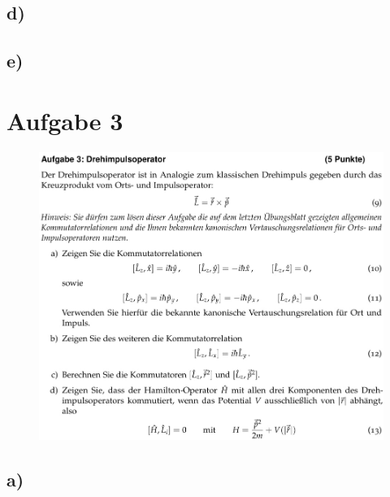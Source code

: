     \subsection{d)}

    \subsection{e)}


\section{Aufgabe 3}

    \begin{figure}[H]
        \centering
        \includegraphics[width=\textwidth]{images/Aufgabe3.jpg}
        \label{fig:3}
    \end{figure}

\newpage
    \subsection{a)}

